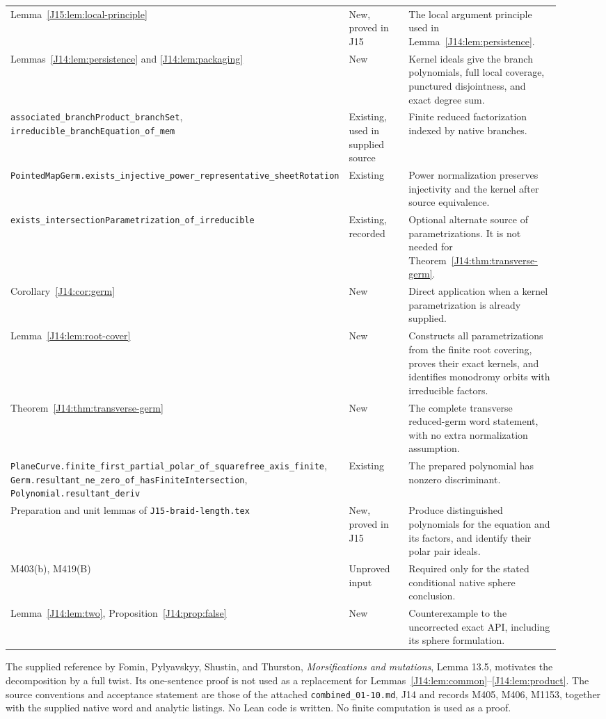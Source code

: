 \documentclass[11pt,oneside]{report}
\theoremstyle{definition}
\numberwithin{equation}{section}
\newcommand{\decl}[1]{\textnormal{\nolinkurl{#1}}}
\begin{document}
\begin{longtable}{>{\raggedright\arraybackslash}p{0.43\linewidth}
                  >{\raggedright\arraybackslash}p{0.15\linewidth}
                  >{\raggedright\arraybackslash}p{0.34\linewidth}}
Lemma~\ref{J15:lem:local-principle}
& New, proved in J15 & The local argument principle used in Lemma~\ref{J14:lem:persistence}.\\
Lemmas~\ref{J14:lem:persistence} and \ref{J14:lem:packaging}
& New & Kernel ideals give the branch polynomials, full local coverage, punctured disjointness, and exact degree sum.\\
\decl{associated_branchProduct_branchSet},
\decl{irreducible_branchEquation_of_mem}
& Existing, used in supplied source & Finite reduced factorization indexed by native branches.\\
\decl{PointedMapGerm.exists_injective_power_representative_sheetRotation}
& Existing & Power normalization preserves injectivity and the kernel after source equivalence.\\
\decl{exists_intersectionParametrization_of_irreducible}
& Existing, recorded & Optional alternate source of parametrizations. It is not needed for Theorem~\ref{J14:thm:transverse-germ}.\\
Corollary~\ref{J14:cor:germ}
& New & Direct application when a kernel parametrization is already supplied.\\
Lemma~\ref{J14:lem:root-cover}
& New & Constructs all parametrizations from the finite root covering, proves their exact kernels, and identifies monodromy orbits with irreducible factors.\\
Theorem~\ref{J14:thm:transverse-germ}
& New & The complete transverse reduced-germ word statement, with no extra normalization assumption.\\
\decl{PlaneCurve.finite_first_partial_polar_of_squarefree_axis_finite},
\decl{Germ.resultant_ne_zero_of_hasFiniteIntersection},
\decl{Polynomial.resultant_deriv}
& Existing & The prepared polynomial has nonzero discriminant.\\
Preparation and unit lemmas of \decl{J15-braid-length.tex}
& New, proved in J15 & Produce distinguished polynomials for the equation and its factors, and identify their polar pair ideals.\\
M403(b), M419(B)
& Unproved input & Required only for the stated conditional native sphere conclusion.\\
Lemma~\ref{J14:lem:two}, Proposition~\ref{J14:prop:false}
& New & Counterexample to the uncorrected exact API, including its sphere formulation.\\
\end{longtable}
\normalsize

The supplied reference by Fomin, Pylyavskyy, Shustin, and Thurston,
\emph{Morsifications and mutations}, Lemma 13.5, motivates the decomposition
by a full twist. Its one-sentence proof is not used as a replacement for
Lemmas~\ref{J14:lem:common}--\ref{J14:lem:product}. The source conventions and
acceptance statement are those of the attached \decl{combined_01-10.md},
J14 and records M405, M406, M1153, together with the supplied native word and
analytic listings. No Lean code is written. No finite computation is used
as a proof.
\end{document}
